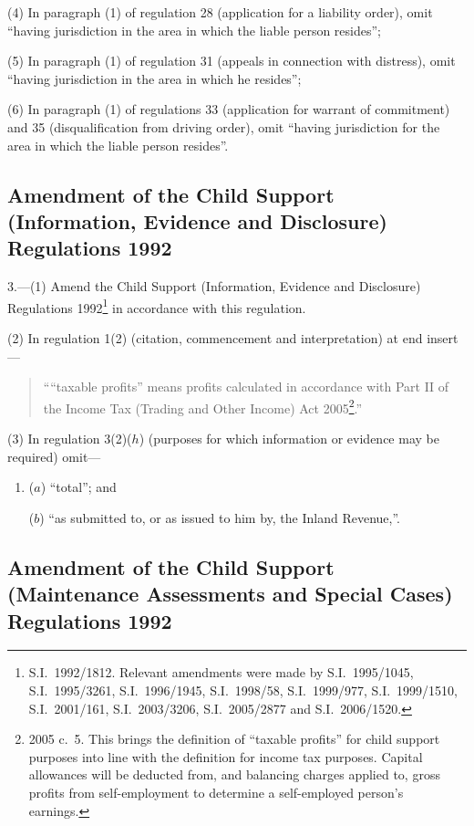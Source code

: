 \documentclass[12pt,a4paper]{article}
\begin{document}
(4) In paragraph (1) of regulation 28 (application for a liability order), omit “having jurisdiction in the area in which the liable person resides”;

(5) In paragraph (1) of regulation 31 (appeals in connection with distress), omit “having jurisdiction in the area in which he resides”;

(6) In paragraph (1) of regulations 33 (application for warrant of commitment) and 35 (disqualification from driving order), omit “having jurisdiction for the area in which the liable person resides”.

\subsection[3. Amendment of the Child Support (Information, Evidence and Disclosure) Regulations 1992]{Amendment of the Child Support (Information, Evidence and Disclosure) Regulations 1992}

3.---(1)  Amend the Child Support (Information, Evidence and Disclosure) Regulations 1992\footnote{S.I.\ 1992/1812. Relevant amendments were made by S.I.\ 1995/1045, S.I.\ 1995/3261, S.I.\ 1996/1945, S.I.\ 1998/58, S.I.\ 1999/977, S.I.\ 1999/1510, S.I.\ 2001/161, S.I.\ 2003/3206, S.I.\ 2005/2877 and S.I.\ 2006/1520.} in accordance with this regulation.

(2) In regulation 1(2) (citation, commencement and interpretation) at end insert—
\begin{quotation}
““taxable profits” means profits calculated in accordance with Part II of the Income Tax (Trading and Other Income) Act 2005\footnote{2005 c.\ 5. This brings the definition of “taxable profits” for child support purposes into line with the definition for income tax purposes. Capital allowances will be deducted from, and balancing charges applied to, gross profits from self-employment to determine a self-employed person’s earnings.}.”
\end{quotation}

(3) In regulation 3(2)($h$)  (purposes for which information or evidence may be required) omit—
\begin{enumerate}\item[]
($a$) “total”; and

($b$) “as submitted to, or as issued to him by, the Inland Revenue,”.
\end{enumerate}

\subsection[4. Amendment of the Child Support (Maintenance Assessments and Special Cases) Regulations 1992]{\sloppy Amendment of the Child Support (Maintenance Assessments and Special Cases) Regulations 1992}
\end{document}
